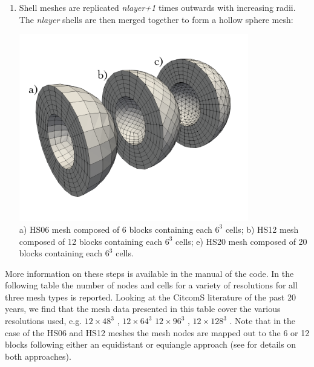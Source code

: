 \begin{enumerate}
\item Shell meshes are replicated {\sl nlayer+1} times outwards with increasing radii. 
The {\sl nlayer} shells are then merged together to form a hollow sphere mesh:
\begin{center}
\includegraphics[width=10cm]{images/ghost/f03_3HS}\\
{\captionfont a) HS06 mesh composed of 6 blocks containing each $6^3$ cells; 
b) HS12 mesh composed of 12 blocks containing each 
$6^3$ cells; e) HS20 mesh composed of 20 blocks containing each $6^3$ cells.}
\end{center}

\end{enumerate}

More information on these steps is available in the manual of the code.
In the following table the number of nodes and cells for a variety of resolutions 
for all three mesh types is reported. Looking at the CitcomS literature of the past 20 years, we find that 
the mesh data presented in this table cover the various resolutions used, e.g.
$12\times48^3$ \cite{mczh04,arfw14}, $12\times64^3$ \cite{budt14}
$12\times96^3$ \cite{bumb10}, $12\times128^3$ \cite{beck06,wele16,welm16}.
Note that in the case of the HS06 and HS12 meshes the mesh nodes are mapped out to the 6 or 12 blocks 
following either an equidistant or equiangle approach (see \cite{puli07}
for details on both approaches). 

